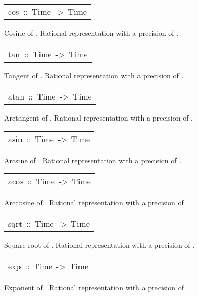 \begin{haddockdesc}
\item[\begin{tabular}{@{}l}
cos\ ::\ Time\ ->\ Time
\end{tabular}]\haddockbegindoc
Cosine of . Rational representation with a precision of
 .\par


\item[\begin{tabular}{@{}l}
tan\ ::\ Time\ ->\ Time
\end{tabular}]\haddockbegindoc
Tangent of . Rational representation with a precision of
 .\par


\item[\begin{tabular}{@{}l}
atan\ ::\ Time\ ->\ Time
\end{tabular}]\haddockbegindoc
Arctangent of . Rational representation with a precision
 of .\par


\item[\begin{tabular}{@{}l}
asin\ ::\ Time\ ->\ Time
\end{tabular}]\haddockbegindoc
Arcsine of . Rational representation with a precision of
 .\par


\item[\begin{tabular}{@{}l}
acos\ ::\ Time\ ->\ Time
\end{tabular}]\haddockbegindoc
Arccosine of . Rational representation with a precision
 of .\par


\item[\begin{tabular}{@{}l}
sqrt\ ::\ Time\ ->\ Time
\end{tabular}]\haddockbegindoc
Square root of . Rational representation with a precision
 of .\par


\item[\begin{tabular}{@{}l}
exp\ ::\ Time\ ->\ Time
\end{tabular}]\haddockbegindoc
Exponent of . Rational representation with a precision of
 .\par



\end{haddockdesc}
